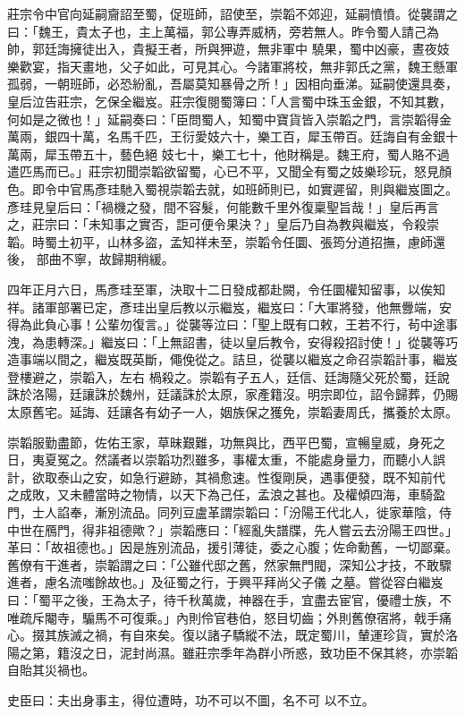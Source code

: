 \begin{pinyinscope}
 莊宗令中官向延嗣齎詔至蜀，促班師，詔使至，崇韜不郊迎，延嗣憤憤。從襲謂之曰：「魏王，貴太子也，主上萬福，郭公專弄威柄，旁若無人。昨令蜀人請己為帥，郭廷誨擁徒出入，貴擬王者，所與狎遊，無非軍中
 驍果，蜀中凶豪，晝夜妓樂歡宴，指天畫地，父子如此，可見其心。今諸軍將校，無非郭氏之黨，魏王懸軍孤弱，一朝班師，必恐紛亂，吾屬莫知暴骨之所！」因相向垂涕。延嗣使還具奏，皇后泣告莊宗，乞保全繼岌。莊宗復閱蜀簿曰：「人言蜀中珠玉金銀，不知其數，何如是之微也！」延嗣奏曰：「臣問蜀人，知蜀中寶貨皆入崇韜之門，言崇韜得金萬兩，銀四十萬，名馬千匹，王衍愛妓六十，樂工百，犀玉帶百。廷誨自有金銀十萬兩，犀玉帶五十，藝色絕
 妓七十，樂工七十，他財稱是。魏王府，蜀人賂不過遣匹馬而已。」莊宗初聞崇韜欲留蜀，心已不平，又聞全有蜀之妓樂珍玩，怒見顏色。即令中官馬彥珪馳入蜀視崇韜去就，如班師則已，如實遲留，則與繼岌圖之。彥珪見皇后曰：「禍機之發，間不容髮，何能數千里外復稟聖旨哉！」皇后再言之，莊宗曰：「未知事之實否，詎可便令果決？」皇后乃自為教與繼岌，令殺崇韜。時蜀土初平，山林多盜，孟知祥未至，崇韜令任圜、張筠分道招撫，慮師還後，
 部曲不寧，故歸期稍緩。



 四年正月六日，馬彥珪至軍，決取十二日發成都赴闕，令任圜權知留事，以俟知祥。諸軍部署已定，彥珪出皇后教以示繼岌，繼岌曰：「大軍將發，他無釁端，安得為此負心事！公輩勿復言。」從襲等泣曰：「聖上既有口敕，王若不行，茍中途事洩，為患轉深。」繼岌曰：「上無詔書，徒以皇后教令，安得殺招討使！」從襲等巧造事端以間之，繼岌既英斷，僶俛從之。詰旦，從襲以繼岌之命召崇韜計事，繼岌登樓避之，崇韜入，左右
 楇殺之。崇韜有子五人，廷信、廷誨隨父死於蜀，廷說誅於洛陽，廷讓誅於魏州，廷議誅於太原，家產籍沒。明宗即位，詔令歸葬，仍賜太原舊宅。延誨、廷讓各有幼子一人，姻族保之獲免，崇韜妻周氏，攜養於太原。



 崇韜服勤盡節，佐佑王家，草昧艱難，功無與比，西平巴蜀，宣暢皇威，身死之日，夷夏冤之。然議者以崇韜功烈雖多，事權太重，不能處身量力，而聽小人誤計，欲取泰山之安，如急行避跡，其禍愈速。性復剛戾，遇事便發，既不知前代
 之成敗，又未體當時之物情，以天下為己任，孟浪之甚也。及權傾四海，車騎盈門，士人諂奉，漸別流品。同列豆盧革謂崇韜曰：「汾陽王代北人，徙家華陰，侍中世在鴈門，得非祖德歟？」崇韜應曰：「經亂失譜牒，先人嘗云去汾陽王四世。」革曰：「故祖德也。」因是旌別流品，援引薄徒，委之心腹；佐命勳舊，一切鄙棄。舊僚有干進者，崇韜謂之曰：「公雖代邸之舊，然家無門閥，深知公才技，不敢驟進者，慮名流嗤餘故也。」及征蜀之行，于興平拜尚父子儀
 之墓。嘗從容白繼岌曰：「蜀平之後，王為太子，待千秋萬歲，神器在手，宜盡去宦官，優禮士族，不唯疏斥閹寺，騸馬不可復乘。」內則伶官巷伯，怒目切齒；外則舊僚宿將，戟手痛心。掇其族滅之禍，有自來矣。復以諸子驕縱不法，既定蜀川，輦運珍貨，實於洛陽之第，籍沒之日，泥封尚濕。雖莊宗季年為群小所惑，致功臣不保其終，亦崇韜自貽其災禍也。



 史臣曰：夫出身事主，得位遭時，功不可以不圖，名不可
 以不立。





\end{pinyinscope}